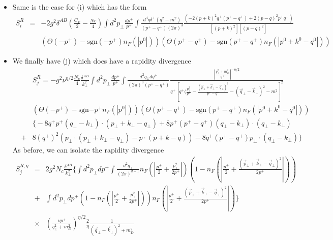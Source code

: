 \documentclass[letter,11pt]{article}
\newcommand{\nn}{\nonumber}
\newcommand{\bea}{\begin{eqnarray}}
\newcommand{\eea}{\end{eqnarray}}
\def\nn{\nonumber}
\begin{document}
\begin{itemize}
\item
Same is the case for (i) which has the form
\small
\bea
 S_i^R&=&-2g^2\delta^{AB}\left(\frac{C_F}{2}-\frac{Nc}{4}\right)\int d^2p_{\perp}\frac{dp^+}{p^+}\int \frac{d^4q\delta^+(q^2-m^2)}{(p^+-q^+)(2\pi)^3}\frac{\left(-2(p+k)^2q^+(p^+-q^+)+2(p-q)^2p^+q^+\right)}{[(p+k)^2][(p-q)^2]}\nn\\
&&\left( \Theta(-p^+)-\text{sgn}(-p^+)n_F(|p^0|)\right)\left(\Theta(p^+-q^+)-\text{sgn}(p^+-q^+)n_F(|p^0+k^0-q^0|)\right)
\eea
\normalsize
\item
We finally have (j) which does have a rapidity divergence
\small
\bea
 &&S_j^R= -g^2\nu^{\eta/2}\frac{N_c}{4}\frac{\delta^{AB}}{k_{\perp}^2}\int d^2p_{\perp}\frac{dp^+}{p^+}\int \frac{d^2q_{\perp}dq^+}{(2\pi)^3(p^+-q^+)} \frac{|\frac{q_{\perp}^2+m_D^2}{q^+}|^{-\eta/2}}{q^+[q^+(\frac{p_{\perp}^2}{p^+}-\frac{(\vec{p}_{\perp}+\vec{k}_{\perp}-\vec{q}_{\perp})^2}{p^+-q^+}-(\vec{q}_{\perp}-\vec{k}_{\perp})^2-m^2]^2}\nn\\
&&\left(\Theta(-p^+)-\text{sgn}{-p^+}n_F(|p^0|)\right)\left(\Theta(p^+-q^+)-\text{sgn}(p^+-q^+)n_F(|p^0+k^0-q^0|)\right)\nn\\
&&\Big\{-8q^+p^+(q_{\perp}-k_{\perp})\cdot(p_{\perp}+k_{\perp}-q_{\perp})+8p^+(p^+-q^+)(q_{\perp}-k_{\perp})\cdot(q_{\perp}-k_{\perp})\nn\\
&+&8(q^+)^2(p_{\perp}\cdot(p_{\perp}+k_{\perp}-q_{\perp})-p\cdot(p+k-q))-8q^+(p^+-q^+)p_{\perp}\cdot(q_{\perp}-k_{\perp})\Big\}
\eea
\normalsize
As before, we can isolate the rapidity divergence 
\bea
 S_j^{R,\eta}&=&   2g^2N_c\frac{\delta^{AB}}{k_{\perp}^2}\Bigg\{\int d^2p_{\perp}dp^+\int \frac{d^2q_{\perp}}{(2\pi)^{d-1}}n_F(|\frac{p^+}{2}+\frac{p_{\perp}^2}{2p^+}|)\left(1-n_F(|\frac{p^+}{2}+\frac{(\vec{p}_{\perp}+\vec{k}_{\perp}-\vec{q}_{\perp})^2}{2p^+}|)\right)\nn\\
 &+&\int d^2p_{\perp}dp^+(1-n_F(|\frac{p^+}{2}+\frac{p_{\perp}^2}{2p^+}|))n_F(|\frac{p^+}{2}+\frac{(\vec{p}_{\perp}+\vec{k}_{\perp}-\vec{q}_{\perp})^2}{2p^+}|)\Bigg\}\nn\\
&\times&\left(\frac{\nu p^+}{q_{\perp}^2+m_D^2}\right)^{\eta/2}\frac{2}{\eta}\frac{1}{(\vec{q}_{\perp}-\vec{k}_{\perp})^2+m_D^2}
\eea

\end{itemize}
\end{document}
